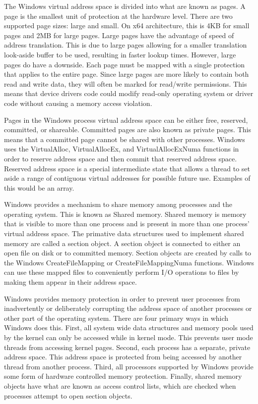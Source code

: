 \documentclass[journal,letterpaper,draftclsnofoot,onecolumn,10pt]{IEEEtran}
\begin{document}
The Windows virtual address space is divided into what are known as pages. A page is the smallest unit of protection at the hardware level. There are two supported page sizes: large and small. On x64 architecture, this is 4KB for small pages and 2MB for large pages. Large pages have the advantage of speed of address translation. This is due to large pages allowing for a smaller translation look-aside buffer to be used, resulting in faster lookup times. However, large pages do have a downside. Each page must be mapped with a single protection that applies to the entire page. Since large pages are more likely to contain both read and write data, they will often be marked for read/write permissions. This means that device drivers code could modify read-only operating system or driver code without causing a memory access violation.\cite{2ris12}

Pages in the Windows process virtual address space can be either free, reserved, committed, or shareable. Committed pages are also known as private pages. This means that a committed page cannot be shared with other processes. Windows uses the VirtualAlloc, VirtualAllocEx, and VirtualAllocExNuma functions in order to reserve address space and then commit that reserved address space. Reserved address space is a special intermediate state that allows a thread to set aside a range of contiguous virtual addresses for possible future use. Examples of this would be an array.\cite{2ris12}

Windows provides a mechanism to share memory among processes and the operating system. This is known as Shared memory. Shared memory is memory that is visible to more than one process and is present in more than one process' virtual address space. The primative data structures used to implement shared memory are called a section object. A section object is connected to either an open file on disk or to committed memory. Section objects are created by calls to the Windows CreateFileMapping or CreateFileMappingNuma functions. Windows can use these mapped files to conveniently perform I/O operations to files by making them appear in their address space.\cite{2ris12}

Windows provides memory protection in order to prevent user processes from inadvertently or deliberately corrupting the address space of another processes or other part of the operating system. There are four primary ways in which Windows does this. First, all system wide data structures and memory pools used by the kernel can only be accessed while in kernel mode. This prevents user mode threads from accessing kernel pages. Second, each process has a separate, private address space. This address space is protected from being accessed by another thread from another process. Third, all processors supported by Windows provide some form of hardware controlled memory protection. Finally, shared memory objects have what are known as access control lists, which are checked when processes attempt to open section objects.\cite{2ris12}
\end{document}
